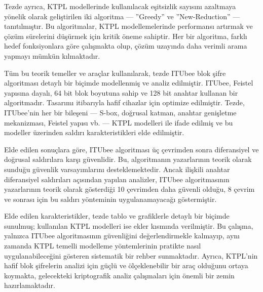 Tezde ayrıca, KTPL modellerinde kullanılacak eşitsizlik sayısını azaltmaya yönelik olarak geliştirilen iki algoritma — ''Greedy'' ve ''New-Reduction'' — tanıtılmıştır. Bu algoritmalar, KTPL modellemelerinde performansı artırmak ve çözüm sürelerini düşürmek için kritik öneme sahiptir. Her bir algoritma, farklı hedef fonksiyonlara göre çalışmakta olup, çözüm uzayında daha verimli arama yapmayı mümkün kılmaktadır.

Tüm bu teorik temeller ve araçlar kullanılarak, tezde ITUbee blok şifre algoritması detaylı bir biçimde modellenmiş ve analiz edilmiştir. ITUbee, Feistel yapısına dayalı, 64 bit blok boyutuna sahip ve 128 bit anahtar kullanan bir algoritmadır. Tasarımı itibarıyla hafif cihazlar için optimize edilmiştir. Tezde, ITUbee’nin her bir bileşeni — S-box, doğrusal katman, anahtar genişletme mekanizması, Feistel yapısı vb. — KTPL modelleri ile ifade edilmiş ve bu modeller üzerinden saldırı karakteristikleri elde edilmiştir.

Elde edilen sonuçlara göre, ITUbee algoritması üç çevrimden sonra diferansiyel ve doğrusal saldırılara karşı güvenlidir. Bu, algoritmanın yazarlarının teorik olarak sunduğu güvenlik varsayımlarını desteklemektedir. Ancak ilişkili anahtar diferansiyel saldırıları açısından yapılan analizler, ITUbee algoritmasının yazarlarının teorik olarak gösterdiği 10 çevrimden daha güvenli olduğu, 8 çevrim ve sonrası için bu saldırı yönteminin uygulanamayacağı göstermiştir. 

Elde edilen karakteristikler, tezde tablo ve grafiklerle detaylı bir biçimde sunulmuş; kullanılan KTPL modelleri ise ekler kısmında verilmiştir. Bu çalışma, yalnızca ITUbee algoritmasının güvenliğini değerlendirmekle kalmayıp, aynı zamanda KTPL temelli modelleme yöntemlerinin pratikte nasıl uygulanabileceğini gösteren sistematik bir rehber sunmaktadır. Ayrıca, KTPL'nin hafif blok şifrelerin analizi için güçlü ve ölçeklenebilir bir araç olduğunu ortaya koymakta, gelecekteki kriptografik analiz çalışmaları için önemli bir zemin hazırlamaktadır.

 